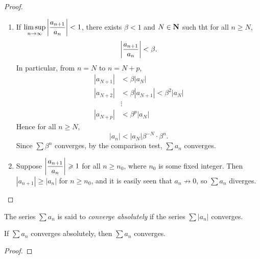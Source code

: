 \begin{proof} \
\begin{enumerate}[label=(\roman*)]
\item If $\displaystyle\limsup_{n\to\infty}\left|\frac{a_{n+1}}{a_n}\right|<1$, there exists $\beta<1$ and $N\in\mathbf N$ such tht for all $n\ge N$,
\[\left|\frac{a_{n+1}}{a_n}\right|<\beta.\]
In particular, from $n=N$ to $n=N+p$,
\begin{align*}
|a_{N+1}|&<\beta|a_N|\\
|a_{N+2}|&<\beta|a_{N+1}|<\beta^2|a_N|\\
&\vdots\\
|a_{N+p}|&<\beta^p|a_N|
\end{align*}
Hence for all $n\ge N$,
\[|a_n|<|a_N|\beta^{-N}\cdot\beta^n.\]
Since $\sum\beta^n$ converges, by the comparison test, $\sum a_n$ converges.
\item Suppose $\displaystyle\left|\frac{a_{n+1}}{a_n}\right|\geqslant1$ for all $n\ge n_0$, where $n_0$ is some fixed integer. Then $|a_{n+1}|\ge|a_n|$ for $n\ge n_0$, and it is easily seen that $a_n\not\to0$, so $\sum a_n$ diverges.
\end{enumerate}
\end{proof}

The series $\sum a_n$ is said to \emph{converge absolutely} if the series $\sum|a_n|$ converges.

\begin{lemma}\label{lemma:absolute-convergence}
If $\sum a_n$ converges absolutely, then $\sum a_n$ converges.
\end{lemma}

\begin{proof}

\end{proof}

